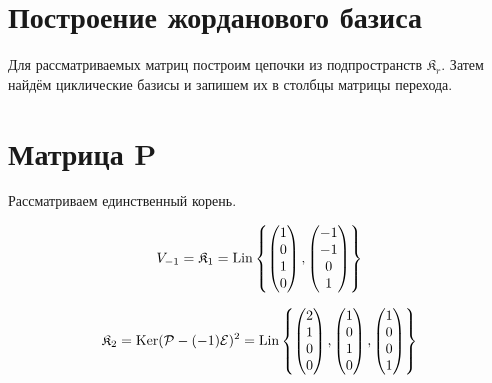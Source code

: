 \documentclass[12pt, a4paper]{article}
\begin{document}
    
    
    \section{Построение жорданового базиса}

    Для рассматриваемых матриц построим цепочки из подпространств $\mathfrak{K}_r$.
    Затем найдём циклические базисы и запишем их в столбцы матрицы перехода.

    \section{Матрица P}

    Рассматриваем единственный корень.

    \begin{equation}
        V_{-1} = \mathfrak{K}_1 = \operatorname{Lin} \left\{ \begin{pmatrix} 1\\0\\1\\0 \end{pmatrix}, \begin{pmatrix} -1\\-1\\0\\1 \end{pmatrix} \right\}
    \end{equation}

    \begin{equation}
        \mathfrak{K}_2 = \operatorname{Ker} (\mathcal{P} - (-1) \mathcal{E})^{2} = \operatorname{Lin} \left\{ \begin{pmatrix} 2\\1\\0\\0 \end{pmatrix}, \begin{pmatrix} 1\\0\\1\\0 \end{pmatrix}, \begin{pmatrix} 1\\0\\0\\1 \end{pmatrix} \right\}
    \end{equation}
\end{document}
